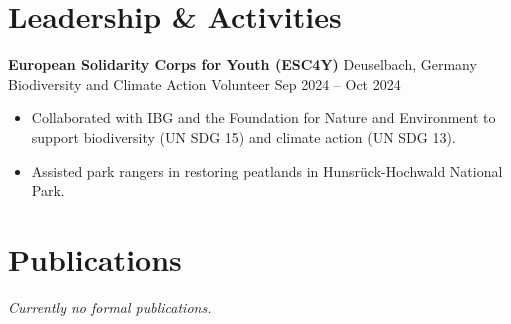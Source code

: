 \documentclass[a4paper,10pt]{article}
\begin{document}
\vspace{0.6em}

\section*{Leadership \& Activities}
\textbf{European Solidarity Corps for Youth (ESC4Y)} \hfill Deuselbach, Germany\\
Biodiversity and Climate Action Volunteer \hfill Sep 2024 -- Oct 2024
\begin{itemize}[noitemsep,topsep=0pt]
    \item Collaborated with IBG and the Foundation for Nature and Environment to support biodiversity (UN SDG 15) and climate action (UN SDG 13).
    \item Assisted park rangers in restoring peatlands in Hunsrück-Hochwald National Park.
\end{itemize}

\vspace{0.6em}

\section*{Publications}
\textit{Currently no formal publications.}
\end{document}
